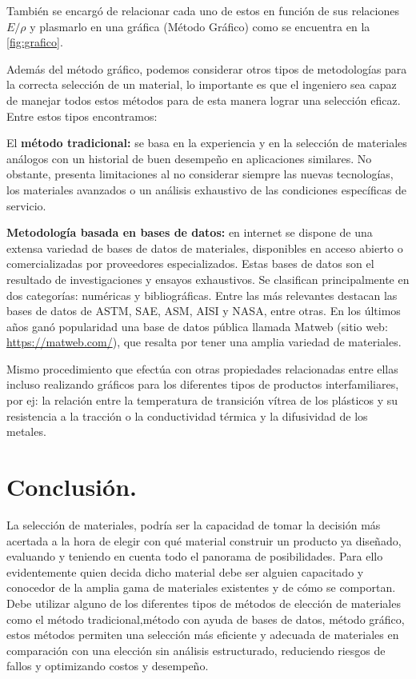 \documentclass[12pt,a4paper]{article}
\begin{document}
También se encargó de relacionar cada uno de estos en función de sus relaciones \(E/\rho\) y plasmarlo en una gráfica (Método Gráfico) como se encuentra en la \autoref{fig:grafico}.

Además del método gráfico, podemos considerar otros tipos de metodologías para la correcta selección de un material, lo importante es que el ingeniero sea capaz de manejar todos estos métodos para de esta manera lograr una selección eficaz. Entre estos tipos encontramos:

El \textbf{método tradicional:} se basa en la experiencia y en la selección de materiales análogos con un historial de buen desempeño en aplicaciones similares. No obstante, presenta limitaciones al no considerar siempre las nuevas tecnologías, los materiales avanzados o un análisis exhaustivo de las condiciones específicas de servicio.

\textbf{Metodología basada en bases de datos:} en internet se dispone de una extensa variedad de bases de datos de materiales, disponibles en acceso abierto o comercializadas por proveedores especializados. Estas bases de datos son el resultado de investigaciones y ensayos exhaustivos. Se clasifican principalmente en dos categorías: numéricas y bibliográficas. Entre las más relevantes destacan las bases de datos de ASTM, SAE, ASM, AISI y NASA, entre otras. En los últimos años ganó popularidad una base de datos pública llamada Matweb (sitio web: \url{https://matweb.com/}), que resalta por tener una amplia variedad de materiales.

Mismo procedimiento que efectúa con otras propiedades relacionadas entre ellas incluso realizando gráficos para los diferentes tipos de productos interfamiliares, por ej: la relación entre la temperatura de transición vítrea de los plásticos y su resistencia a la tracción o la conductividad térmica y la difusividad de los metales.

\section{Conclusión.}

La selección de materiales, podría ser la capacidad de tomar la decisión más acertada a la hora de elegir con qué material construir un producto ya diseñado, evaluando y teniendo en cuenta todo el panorama de posibilidades. Para ello evidentemente quien decida dicho material debe ser alguien capacitado y conocedor de la amplia gama de materiales existentes y de cómo se comportan. Debe utilizar alguno de los diferentes tipos de métodos de elección de materiales como el método tradicional,método con ayuda de bases de datos, método gráfico, estos métodos permiten una selección más eficiente y adecuada de materiales en comparación con una elección sin análisis estructurado, reduciendo riesgos de fallos y optimizando costos y desempeño.
\end{document}

